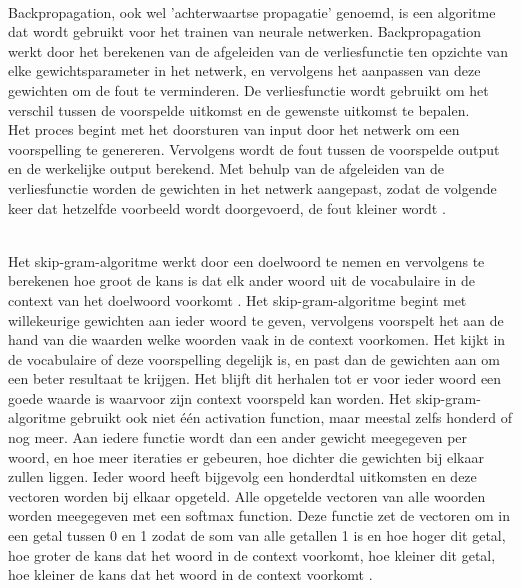 \\\indent
Backpropagation, ook wel 'achterwaartse propagatie' genoemd, is een algoritme dat wordt gebruikt voor het trainen van neurale netwerken. Backpropagation werkt door het berekenen van de afgeleiden van de verliesfunctie ten opzichte van elke gewichtsparameter in het netwerk, en vervolgens het aanpassen van deze gewichten om de fout te verminderen. De verliesfunctie wordt gebruikt om het verschil tussen de voorspelde uitkomst en de gewenste uitkomst te bepalen.
\\\indent
Het proces begint met het doorsturen van input door het netwerk om een voorspelling te genereren. Vervolgens wordt de fout tussen de voorspelde output en de werkelijke output berekend. Met behulp van de afgeleiden van de verliesfunctie worden de gewichten in het netwerk aangepast, zodat de volgende keer dat hetzelfde voorbeeld wordt doorgevoerd, de fout kleiner wordt \autocite{Starmer2023}.

\\\indent
Het skip-gram-algoritme werkt door een doelwoord te nemen en vervolgens te berekenen hoe groot de kans is dat elk ander woord uit de vocabulaire in de context van het doelwoord voorkomt \autocite{Starmer2023}.
Het skip-gram-algoritme begint met willekeurige gewichten aan ieder woord te geven, vervolgens voorspelt het aan de hand van die waarden welke woorden vaak in de context voorkomen. Het kijkt in de vocabulaire of deze voorspelling degelijk is, en past dan de gewichten aan om een beter resultaat te krijgen. Het blijft dit herhalen tot er voor ieder woord een goede waarde is waarvoor zijn context voorspeld kan worden. Het skip-gram-algoritme gebruikt ook niet één activation function, maar meestal zelfs honderd of nog meer. Aan iedere functie wordt dan een ander gewicht meegegeven per woord, en hoe meer iteraties er gebeuren, hoe dichter die gewichten bij elkaar zullen liggen. Ieder woord heeft bijgevolg een honderdtal uitkomsten en deze vectoren worden bij elkaar opgeteld. Alle opgetelde vectoren van alle woorden worden meegegeven met een softmax function. Deze functie zet de vectoren om in een getal tussen 0 en 1 zodat de som van alle getallen 1 is en hoe hoger dit getal, hoe groter de kans dat het woord in de context voorkomt, hoe kleiner dit getal, hoe kleiner de kans dat het woord in de context voorkomt \autocite{Starmer2023}.

